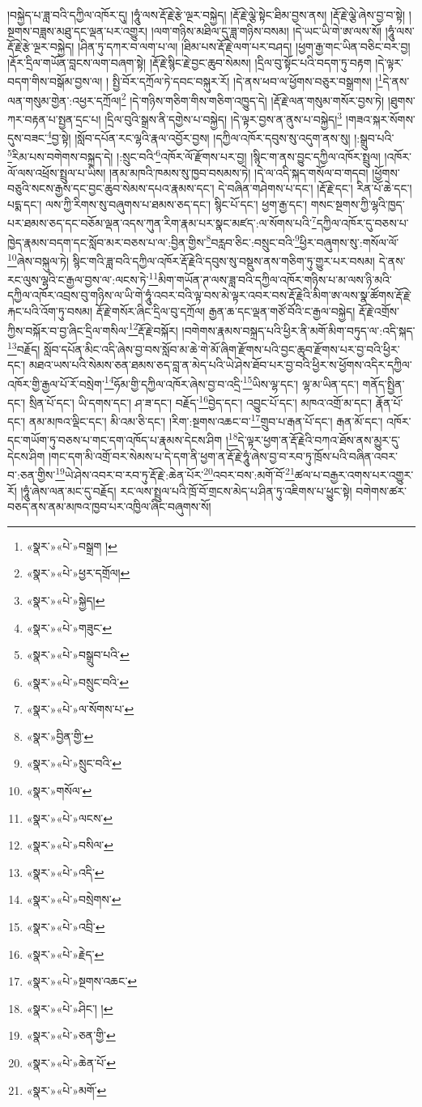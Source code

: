 །བསྐྱེད་པ་ཟླ་བའི་དཀྱིལ་འཁོར་དུ། །ཧཱུཾ་ལས་རྡོ་རྗེ་རྩེ་ལྔར་བསྐྱེད། །རྡོ་རྗེ་ལྕེ་སྟེང་ཐིམ་བྱས་ནས། །རྡོ་རྗེ་ལྕེ་ཞེས་བྱ་བ་སྟེ། །སྔགས་བཟླས་མཐུ་དང་ལྡན་པར་འགྱུར། །ལག་གཉིས་མཐིལ་དུ་ཟླ་གཉིས་བསམ། །དེ་ཡང་ཡི་གེ་ཨ་ལས་སོ། །ཧཱུཾ་ལས་རྡོ་རྗེ་རྩེ་ལྔར་བསྐྱེད། །ཤིན་ཏུ་དཀར་བ་ལག་པ་ལ། །ཐིམ་པས་རྡོ་རྗེ་ལག་པར་བཤད། །ཕྱག་རྒྱ་གང་ཡིན་བཅིང་བར་བྱ། །རྡོར་དྲིལ་གཡོན་བླངས་ལག་བཞག་སྟེ། །རྡོ་རྗེ་སྙིང་རྗེ་བྱང་ཆུབ་སེམས། །དྲིལ་བུ་སྟོང་པའི་བདག་ཏུ་བརྟག །དེ་ལྟར་བདག་གིས་བསྒོམ་བྱས་ལ། །
སྤྱི་བོར་དཀྲོལ་ཏེ་དབང་བསྐུར་རོ། །དེ་ནས་ཕབ་ལ་ཕྱོགས་བཅུར་བསྒྲགས། །\footnote{«སྣར་»«པེ་»བསྒྲག །}དེ་ནས་ལན་གསུམ་གྱེན་:འཕྱར་དཀྲོལ།\footnote{«སྣར་»«པེ་»ཕྱར་དགྲོལ།} །དེ་གཉིས་གཅིག་གིས་གཅིག་འཁྱུད་དེ། །རྡོ་རྗེ་ལན་གསུམ་གསོར་བྱས་ཏེ། །ཐུགས་ཀར་བརྟན་པ་སྤྱན་དྲང་པ། །དྲིལ་བུའི་སྒྲས་ནི་དགྱེས་པ་བསྐྱེད། །དེ་ལྟར་བྱས་ན་ནུས་པ་བསྐྱེད།\footnote{«སྣར་»«པེ་»སྐྱེད།} །གཟའ་སྐར་སོགས་དུས་བཟང་\footnote{«སྣར་»«པེ་»གཟུང་}བྱ་སྟེ། །སློབ་དཔོན་རང་ལྷའི་རྣལ་འབྱོར་བྱས། །དཀྱིལ་འཁོར་དབུས་སུ་འདུག་ནས་སུ། །:སྒྲུབ་པའི་\footnote{«སྣར་»«པེ་»བསྒྲུབ་པའི་}རིམ་པས་བགེགས་བསྐྲད་དེ། །:སྲུང་བའི་\footnote{«སྣར་»«པེ་»བསྲུང་བའི་}འཁོར་ལོ་རྫོགས་པར་བྱ། །སྙིང་ག་ནས་བྱུང་དཀྱིལ་འཁོར་སྤྲུལ། །འཁོར་ལོ་ལས་འཕྲོས་སྤྲུལ་པ་ཡིས། །ནམ་མཁའི་ཁམས་སུ་ཁྱབ་བསམས་ཏེ། །དེ་ལ་འདི་སྐད་གསོལ་བ་གདབ། །ཕྱོགས་བཅུའི་སངས་རྒྱས་དང་བྱང་ཆུབ་སེམས་དཔའ་རྣམས་དང་། དེ་བཞིན་གཤེགས་པ་དང་། །རྡོ་རྗེ་དང་། རིན་པོ་ཆེ་དང་། པདྨ་དང་། ལས་ཀྱི་རིགས་སུ་བཞུགས་པ་ཐམས་ཅད་དང་། སྙིང་པོ་དང་། ཕྱག་རྒྱ་དང་། གསང་སྔགས་ཀྱི་ལྷའི་ཁྱད་པར་ཐམས་ཅད་དང་བཅོམ་ལྡན་འདས་ཀུན་རིག་རྣམ་པར་སྣང་མཛད་:ལ་སོགས་པའི་\footnote{«སྣར་»«པེ་»ལ་སོགས་པ་}དཀྱིལ་འཁོར་དུ་བཅས་པ་ཁྱེད་རྣམས་བདག་དང་སློབ་མར་བཅས་པ་ལ་:བྱིན་གྱིས་\footnote{«སྣར་»བྱིན་གྱི་}བརླབ་ཅིང་:བསྲུང་བའི་\footnote{«སྣར་»«པེ་»སྲུང་བའི་}ཕྱིར་བཞུགས་སུ་:གསོལ་ལོ་\footnote{«སྣར་»གསོལ་}ཞེས་བསྐུལ་ཏེ། སྙིང་གའི་ཟླ་བའི་དཀྱིལ་འཁོར་རྡོ་རྗེའི་དབུས་སུ་བསྡུས་ནས་གཅིག་ཏུ་གྱུར་པར་བསམ། དེ་ནས་རང་ལུས་ལྷའི་ང་རྒྱལ་བྱས་ལ་:ལངས་ཏེ་\footnote{«སྣར་»«པེ་»ལངས་}མིག་གཡོན་ཊ་ལས་ཟླ་བའི་དཀྱིལ་འཁོར་གཉིས་པ་མ་ལས་ཉི་མའི་དཀྱིལ་འཁོར་འབྲས་བུ་གཉིས་ལ་ཡི་གེ་ཧཱུཾ་འབར་བའི་ལྟ་བས་མེ་ལྟར་འབར་བས་རྡོ་རྗེའི་མིག་ཨ་ལས་སྣ་ཚོགས་རྡོ་རྗེ་རྐང་པའི་འོག་ཏུ་བསམ། རྡོ་རྗེ་གསོར་ཞིང་དྲིལ་བུ་དཀྲོལ། རྒྱན་ཆ་དང་ལྡན་གཙོ་བོའི་ང་རྒྱལ་བསྐྱེད། རྡོ་རྗེ་འགྲོས་ཀྱིས་བསྐོར་བ་བྱ་ཞིང་དྲིལ་གསིལ་\footnote{«སྣར་»«པེ་»བསིལ་}རྡོ་རྗེ་བསྐོར། །བགེགས་རྣམས་བསྐྲད་པའི་ཕྱིར་ནི་མགོ་མིག་བཏུད་ལ་:འདི་སྐད་\footnote{«སྣར་»«པེ་»འདི་}བརྗོད། སློབ་དཔོན་མིང་འདི་ཞེས་བྱ་བས་སློབ་མ་ཆེ་གེ་མོ་ཞིག་རྫོགས་པའི་བྱང་ཆུབ་རྫོགས་པར་བྱ་བའི་ཕྱིར་དང་། མཐའ་ཡས་པའི་སེམས་ཅན་ཐམས་ཅད་བླ་ན་མེད་པའི་ཡེ་ཤེས་ཐོབ་པར་བྱ་བའི་ཕྱིར་ས་ཕྱོགས་འདིར་དཀྱིལ་འཁོར་གྱི་རྒྱལ་པོ་རོ་བསྲེག་\footnote{«སྣར་»«པེ་»བསྲེགས་}ཧོམ་གྱི་དཀྱིལ་འཁོར་ཞེས་བྱ་བ་འདྲི་\footnote{«སྣར་»«པེ་»འབྲི་}ཡིས་ལྷ་དང་། ལྷ་མ་ཡིན་དང་། གནོད་སྤྱིན་དང་། སྲིན་པོ་དང་། ཡི་དགས་དང་། ཤ་ཟ་དང་། བརྗོད་\footnote{«སྣར་»«པེ་»རྗེད་}བྱེད་དང་། འབྱུང་པོ་དང་། མཁའ་འགྲོ་མ་དང་། རྣོན་པོ་དང་། ནམ་མཁའ་ལྡིང་དང་། མི་འམ་ཅི་དང་། །རིག་:སྔགས་འཆང་བ་\footnote{«སྣར་»«པེ་»སྔགས་འཆང་}གྲུབ་པ་རྒན་པོ་དང་། རྒན་མོ་དང་། འཁོར་དང་གཡོག་ཏུ་བཅས་པ་གང་དག་འཁོད་པ་རྣམས་དེངས་ཤིག །\footnote{«སྣར་»«པེ་»ཤིང་། །}དེ་ལྟར་ཕྱག་ན་རྡོ་རྗེའི་བཀའ་ཐོས་ནས་མྱུར་དུ་དེངས་ཤིག །གང་དག་མི་འགྲོ་བར་སེམས་པ་དེ་དག་ནི་ཕྱག་ན་རྡོ་རྗེ་ཧཱུཾ་ཞེས་བྱ་བ་རབ་ཏུ་ཁྲོས་པའི་བཞིན་འབར་བ་:ཅན་གྱིས་\footnote{«སྣར་»«པེ་»ཅན་གྱི་}ཡེ་ཤེས་འབར་བ་རབ་ཏུ་རྡོ་རྗེ་:ཆེན་པོར་\footnote{«སྣར་»«པེ་»ཆེན་པོ་}འབར་བས་:མགོ་བོ་\footnote{«སྣར་»«པེ་»མགོ་}ཚལ་པ་བརྒྱར་འགས་པར་འགྱུར་རོ། །ཧཱུཾ་ཞེས་ལན་མང་དུ་བརྗོད། རང་ལས་སྤྲུལ་པའི་ཁྲོ་བོ་གྲངས་མེད་པ་ཤིན་ཏུ་འཇིགས་པ་ཕྱུང་སྟེ། བགེགས་ཚར་བཅད་ནས་ནམ་མཁའ་ཁྱབ་པར་འཁྱིལ་ཞིང་བཞུགས་སོ། 